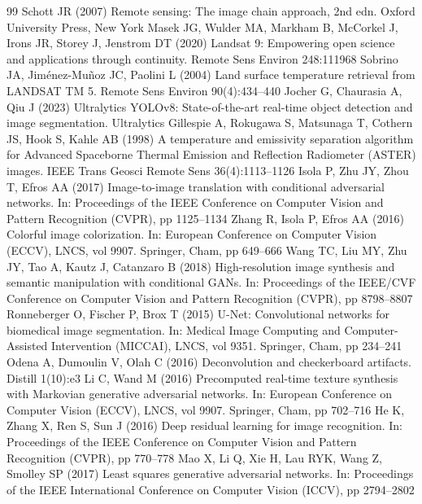 \documentclass[10pt,a4paper,twoside]{article}
\begin{document}
\begin{thebibliography}{99}
    \footnotesize
    \setlength{\itemsep}{1.5pt}
     Schott JR (2007) Remote sensing: The image chain approach, 2nd edn. Oxford University Press, New York
     Masek JG, Wulder MA, Markham B, McCorkel J, Irons JR, Storey J, Jenstrom DT (2020) Landsat 9: Empowering open science and applications through continuity. Remote Sens Environ 248:111968
     Sobrino JA, Jim\'{e}nez-Mu\~{n}oz JC, Paolini L (2004) Land surface temperature retrieval from LANDSAT TM 5. Remote Sens Environ 90(4):434--440
     Jocher G, Chaurasia A, Qiu J (2023) Ultralytics YOLOv8: State-of-the-art real-time object detection and image segmentation. Ultralytics
     Gillespie A, Rokugawa S, Matsunaga T, Cothern JS, Hook S, Kahle AB (1998) A temperature and emissivity separation algorithm for Advanced Spaceborne Thermal Emission and Reflection Radiometer (ASTER) images. IEEE Trans Geosci Remote Sens 36(4):1113--1126
     Isola P, Zhu JY, Zhou T, Efros AA (2017) Image-to-image translation with conditional adversarial networks. In: Proceedings of the IEEE Conference on Computer Vision and Pattern Recognition (CVPR), pp 1125--1134
     Zhang R, Isola P, Efros AA (2016) Colorful image colorization. In: European Conference on Computer Vision (ECCV), LNCS, vol 9907. Springer, Cham, pp 649--666
     Wang TC, Liu MY, Zhu JY, Tao A, Kautz J, Catanzaro B (2018) High-resolution image synthesis and semantic manipulation with conditional GANs. In: Proceedings of the IEEE/CVF Conference on Computer Vision and Pattern Recognition (CVPR), pp 8798--8807
     Ronneberger O, Fischer P, Brox T (2015) U-Net: Convolutional networks for biomedical image segmentation. In: Medical Image Computing and Computer-Assisted Intervention (MICCAI), LNCS, vol 9351. Springer, Cham, pp 234--241
     Odena A, Dumoulin V, Olah C (2016) Deconvolution and checkerboard artifacts. Distill 1(10):e3
     Li C, Wand M (2016) Precomputed real-time texture synthesis with Markovian generative adversarial networks. In: European Conference on Computer Vision (ECCV), LNCS, vol 9907. Springer, Cham, pp 702--716
     He K, Zhang X, Ren S, Sun J (2016) Deep residual learning for image recognition. In: Proceedings of the IEEE Conference on Computer Vision and Pattern Recognition (CVPR), pp 770--778
     Mao X, Li Q, Xie H, Lau RYK, Wang Z, Smolley SP (2017) Least squares generative adversarial networks. In: Proceedings of the IEEE International Conference on Computer Vision (ICCV), pp 2794--2802

\end{thebibliography}
\end{document}

